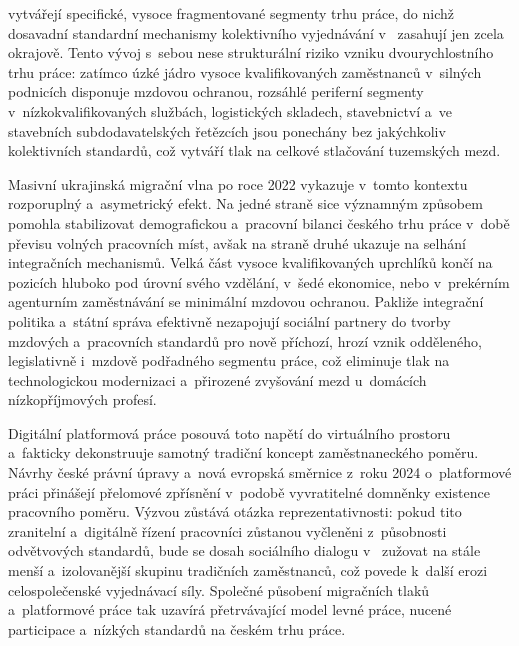  vytvářejí specifické, vysoce fragmentované segmenty trhu práce, do nichž dosavadní standardní mechanismy kolektivního vyjednávání v~ zasahují jen zcela okrajově. Tento vývoj s~sebou nese strukturální riziko vzniku dvourychlostního trhu práce: zatímco úzké jádro vysoce kvalifikovaných zaměstnanců v~silných podnicích disponuje mzdovou ochranou, rozsáhlé periferní segmenty v~nízkokvalifikovaných službách, logistických skladech, stavebnictví a~ve stavebních subdodavatelských řetězcích jsou ponechány bez jakýchkoliv kolektivních standardů, což vytváří tlak na celkové stlačování tuzemských mezd.\par

Masivní ukrajinská migrační vlna po roce 2022 vykazuje v~tomto kontextu rozporuplný a~asymetrický efekt. Na jedné straně sice významným způsobem pomohla stabilizovat demografickou a~pracovní bilanci českého trhu práce v~době převisu volných pracovních míst, avšak na straně druhé ukazuje na selhání integračních mechanismů. Velká část vysoce kvalifikovaných uprchlíků končí na pozicích hluboko pod úrovní svého vzdělání, v~šedé ekonomice, nebo v~prekérním agenturním zaměstnávání se minimální mzdovou ochranou. Pakliže integrační politika a~státní správa efektivně nezapojují sociální partnery do tvorby mzdových a~pracovních standardů pro nově příchozí, hrozí vznik odděleného, legislativně i~mzdově podřadného segmentu práce, což eliminuje tlak na technologickou modernizaci a~přirozené zvyšování mezd u~domácích nízkopříjmových profesí.~\cite{PolentsDvorakova_UkraineRefugees2024}\par

Digitální platformová práce posouvá toto napětí do virtuálního prostoru a~fakticky dekonstruuje samotný tradiční koncept zaměstnaneckého poměru. Návrhy české právní úpravy a~nová evropská směrnice z~roku 2024 o~platformové práci přinášejí přelomové zpřísnění v~podobě vyvratitelné domněnky existence pracovního poměru. Výzvou zůstává otázka reprezentativnosti: pokud tito zranitelní a~digitálně řízení pracovníci zůstanou vyčleněni z~působnosti odvětvových standardů, bude se dosah sociálního dialogu v~ zužovat na stále menší a~izolovanější skupinu tradičních zaměstnanců, což povede k~další erozi celospolečenské vyjednávací síly. Společné působení migračních tlaků a~platformové práce tak uzavírá přetrvávající model levné práce, nucené participace a~nízkých standardů na českém trhu práce.\par
